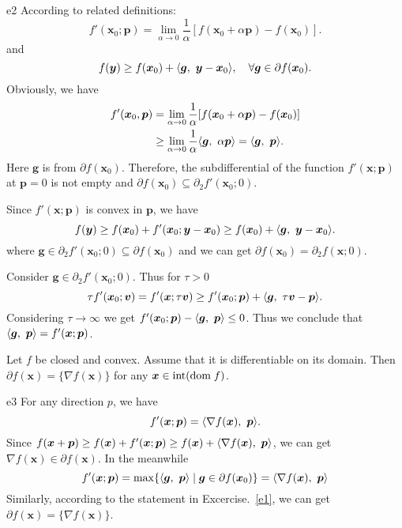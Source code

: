 \documentclass{article}
\newcommand{\xB}{\bm{x}}
\newcommand{\yB}{\bm{y}}
\newcommand{\gB}{\bm{g}}
\newcommand{\pB}{\bm{p}}
\newcommand{\domf}{\textrm{dom\;}f}
\begin{document}
\begin{PROOF}{e2}
	According to related definitions:
	\[
		f'(\xB_0; \pB) = \lim_{\alpha \to 0} \frac{1}{\alpha} [f(\xB_0 + \alpha\pB) - f(\xB_0)].
	\]
	and
	\[
		f(\yB) \ge f(\xB_0) + \innerproduct{\gB}{\yB - \xB_0}, \quad \forall \gB \in \partial f(\xB_0).
	\]
	Obviously, we have
	\[
		\begin{aligned}
			f'(\xB_0, \pB) &= \lim_{\alpha \to 0} \frac{1}{\alpha} [f(\xB_0 + \alpha\pB) - f(\xB_0)]\\
			&\ge \lim_{\alpha \to 0} \frac{1}{\alpha} \innerproduct{\gB}{\alpha \pB} = \innerproduct{\gB}{\pB}.
		\end{aligned}	
	\]
	Here \(\gB\) is from \(\partial f(\xB_0)\). Therefore, the subdifferential of the function \(f'(\xB;\pB)\) at 
	\(\pB = 0\) is not empty and \(\partial f(\xB_0) \subseteq \partial_2 f'(\xB_0; 0)\).

	Since \(f'(\xB;\pB)\) is convex in \(\pB\), we have
	\[
		f(\yB) \ge f(\xB_0) + f'(\xB_0; \yB - \xB_0) \ge f(\xB_0) + \innerproduct{\gB}{\yB - \xB_0}.	
	\]
	where \(\gB \in \partial_2 f'(\xB_0;0) \subseteq \partial f(\xB_0)\) and we can get \(\partial f(\xB_0) = \partial_2 f(\xB;0)\).

	Consider \(\gB \in \partial_2 f'(\xB_0;0)\). Thus for \(\tau >0\)
	\[
		\tau f'(\xB_0; \bm v) = f'(\xB; \tau\bm v) \ge f'(\xB_0; \pB) + \innerproduct{\gB}{\tau \bm v - \pB}.
	\]
	Considering \(\tau \to \infty\) we get \(f'(\xB_0; \pB) - \innerproduct{\gB}{\pB} \le 0\). Thus we conclude that \(\innerproduct{\gB}{\pB} = f'(\xB;\pB)\).
\end{PROOF}

\begin{excercise}\label{e3}
Let $f$ be closed and convex. Assume that it is differentiable on its domain. Then 
$\partial f(\xB) = \{ \nabla  f(\xB) \}$
for any $\xB \in \textrm{int}(\domf)$.
\end{excercise}

\begin{PROOF}{e3}
	For any direction \(p\), we have
	\[
		f'(\xB; \pB) = \innerproduct{\nabla f(\xB)}{\pB}.	
	\]
	Since \(f(\xB + \pB) \ge f(\xB) + f'(\xB; \pB) \ge f(\xB) + \innerproduct{\nabla f(\xB)}{\pB}\),
	we can get \(\nabla f(\xB) \in \partial f(\xB)\). In the meanwhile
	\[
		f'(\xB; \pB) = \max \{\innerproduct{\gB}{\pB} \mid \gB \in \partial f(\xB_0)\} = \innerproduct{\nabla f(\xB)}{\pB}
	\]
	Similarly, according to the statement in Excercise.~\ref{e1}, we can get \(\partial f(\xB) = \{\nabla f(\xB)\}\).
\end{PROOF}
\end{document}

